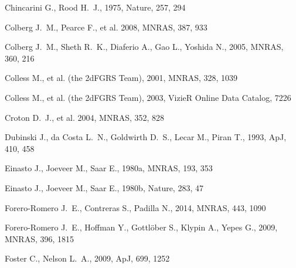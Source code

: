\documentclass[a4,useAMS,usenatbib,usegraphicx]{mn2e}
\newcommand{\apj}{ApJ}
\newcommand{\mnras}{MNRAS}
\newcommand{\nat}{Nature}
\begin{document}
\begin{thebibliography}{}
{Chincarini} G.,  {Rood} H.~J.,  1975, \nat, 257, 294

{Colberg} J.~M.,  {Pearce} F.,    et al. 2008, \mnras, 387, 933

{Colberg} J.~M.,  {Sheth} R.~K.,  {Diaferio} A.,  {Gao} L.,    {Yoshida} N.,
  2005, \mnras, 360, 216

{Colless} M.,  et al.   {(the 2dFGRS Team),} 2001, \mnras, 328, 1039

{Colless} M.,  et al.   {(the 2dFGRS Team),} 2003, VizieR Online Data Catalog,
  7226

{Croton} D.~J.,  et al. 2004, \mnras, 352, 828

{Dubinski} J.,  {da Costa} L.~N.,  {Goldwirth} D.~S.,  {Lecar} M.,    {Piran}
  T.,  1993, \apj, 410, 458

{Einasto} J.,  {Joeveer} M.,    {Saar} E.,  1980a, \mnras, 193, 353

{Einasto} J.,  {Joeveer} M.,    {Saar} E.,  1980b, \nat, 283, 47

{Forero-Romero} J.~E.,  {Contreras} S.,    {Padilla} N.,  2014, \mnras, 443,
  1090

{Forero-Romero} J.~E.,  {Hoffman} Y.,  {Gottl{\"o}ber} S.,  {Klypin} A.,
  {Yepes} G.,  2009, \mnras, 396, 1815

{Foster} C.,  {Nelson} L.~A.,  2009, \apj, 699, 1252


\end{thebibliography}
\end{document}
